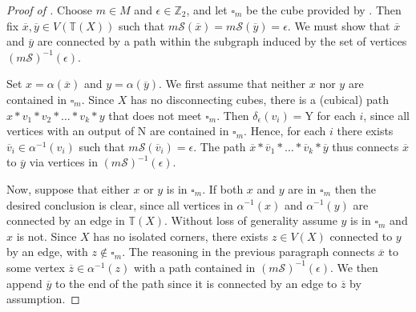 \documentclass[12pt, letterpaper]{article}
\newcommand{\Z}{\mathbb{Z}}
\def\Z{\mathbb{Z}}
\theoremstyle{plain}
\theoremstyle{definition}
\begin{document}
\begin{proof}[Proof of ]
Choose $m \in M$ and $\epsilon \in \Z_2$, and let $\square_m$ be the cube provided by . Then fix $\overline{x}, \overline{y} \in V(\mathbb{T}(X))$ such that $m \mathcal{S} \left( \overline{x} \right) = m \mathcal{S} \left( \overline{y} \right) = \epsilon$. We must show that $\overline{x}$ and $\overline{y}$ are connected by a path within the subgraph induced by the set of vertices $\left( m \mathcal{S} \right)^{-1} (\epsilon)$.  

Set $x=\alpha\left(\overline{x}\right)$ and $y=\alpha\left(\overline{y}\right)$. We first assume that neither $x$ nor $y$ are contained in $\square_m$. Since $X$ has no disconnecting cubes, there is a (cubical) path $x * v_1 * v_2 * \hdots * v_k * y$ that does not meet $\square_m$. Then $\delta_\epsilon (v_i) = \text{Y}$ for each $i$, since all vertices with an output of N are contained in $\square_m$. Hence, for each $i$ there exists $\overline{v}_i \in \alpha^{-1}(v_i)$ such that $m \mathcal{S} \left( \overline{v}_i \right) = \epsilon$. The path $\overline{x} * \overline{v}_1 * \hdots * \overline{v}_k * \overline{y}$ thus connects $\overline{x}$ to $\overline{y}$ via vertices in $\left( m \mathcal{S} \right)^{-1} (\epsilon)$.

Now, suppose that either $x$ or $y$ is in $\square_m$. If both $x$ and $y$ are in $\square_m$ then the desired conclusion is clear, since all vertices in $\alpha^{-1}(x)$ and $\alpha^{-1}(y)$ are connected by an edge in $\mathbb{T}(X)$. Without loss of generality assume $y$ is in $\square_m$ and $x$ is not. Since $X$ has no isolated corners, there exists $z \in V(X)$ connected to $y$ by an edge, with $z \notin \square_m$. The reasoning in the previous paragraph connects $\overline{x}$ to some vertex $\overline{z} \in \alpha^{-1}(z)$ with a path contained in $\left( m \mathcal{S} \right)^{-1} (\epsilon)$. We then append $\overline{y}$ to the end of the path since it is connected by an edge to $\overline{z}$ by assumption.
\end{proof}
\end{document}
